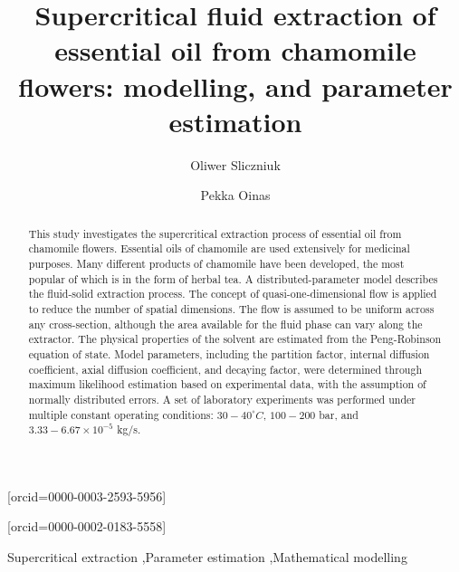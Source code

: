 \documentclass[a4paper,fleqn]{cas-dc}
\begin{document}
 

\title[mode=title]{Supercritical fluid extraction of essential oil from chamomile flowers: modelling, and parameter estimation}                      


\author[1]{Oliwer Sliczniuk}[orcid=0000-0003-2593-5956]
\cormark[1]

\author[1]{Pekka Oinas}[orcid=0000-0002-0183-5558]

\address[1]{Aalto University, School of Chemical Engineering, Espoo, 02150, Finland}


\begin{abstract}
This study investigates the supercritical extraction process of essential oil from chamomile flowers.  Essential oils of chamomile are used extensively for medicinal purposes. Many different products of chamomile have been developed, the most popular of which is in the form of herbal tea. A distributed-parameter model describes the fluid-solid extraction process. The concept of quasi-one-dimensional flow is applied to reduce the number of spatial dimensions. The flow is assumed to be uniform across any cross-section, although the area available for the fluid phase can vary along the extractor. The physical properties of the solvent are estimated from the Peng-Robinson equation of state. Model parameters, including the partition factor, internal diffusion coefficient, axial diffusion coefficient, and decaying factor, were determined through maximum likelihood estimation based on experimental data, with the assumption of normally distributed errors. A set of laboratory experiments was performed under multiple constant operating conditions: $30 - 40^\circ C$, $100 - 200$ bar, and $3.33-6.67 \times 10^{-5}$ kg/s. 

\end{abstract}

\begin{keywords}
Supercritical extraction \sep Parameter estimation \sep Mathematical modelling
\end{keywords}
\end{document}
